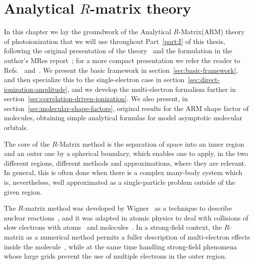 


\chapter[Analytical R-matrix theory]{Analytical $R$-matrix theory}
\label{chap:R-matrix}

In this chapter we lay the groundwork of the Analytical $R$-Matrix(ARM) theory of photoionization that we will use throughout Part~\ref{part:I} of this thesis, following the original presentation of the theory~\cite{ARM_initial, ARM_initial_multielectron} and the formulation in the author's MRes report~\cite{MResReport}; for a more compact presentation we refer the reader to Refs.~\citealp{Pisanty_slalom_2016} and~\citealp{ARM_abinitio_verification}. We present the basic framework in section~\ref{sec:basic-framework}, and then specialize this to the single-electron case in section~\ref{sec:direct-ionization-amplitude}, and we develop the multi-electron formalism further in section~\ref{sec:correlation-driven-ionization}. We also present, in section~\ref{sec:molecular-shape-factors}, original results for the ARM shape factor of molecules, obtaining simple analytical formulas for model asymptotic molecular orbitals.


The core of the $R$-Matrix method is the separation of space into an inner region and an outer one by a spherical boundary, which enables one to apply, in the two different regions, different methods and approximations, where they are relevant. In general, this is often done when there is a complex many-body system which is, nevertheless, well approximated as a single-particle problem outside of the given region.

The $R$-matrix method was developed by Wigner~\cite{Rmatrix_Wigner} as a technique to describe nuclear reactions~\cite{Rmatrix_nuclear_review}, and it was adapted in atomic physics to deal with collisions of slow electrons with atoms~\cite{Rmatrix_atomic} and molecules~\cite{Rmatrix_molecular}. In a strong-field context, the $R$-matrix as a numerical method permits a fuller description of multi-electron effects inside the molecule~\cite{ Rmatrix_time_dependent}, while at the same time handling strong-field phenomena whose large grids prevent the use of multiple electrons in the outer region.

$\quad$

